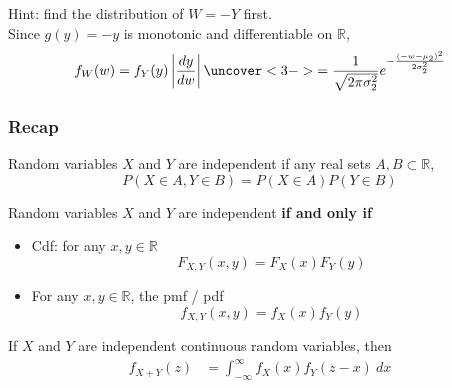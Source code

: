 \documentclass[slidestop,compress,mathserif]{beamer}
\begin{document}
%
%
%


\begin{frame}%
\pause
Hint: find the distribution of $W = -Y$ first. \\
Since $g(y) = -y$ is monotonic and differentiable on $\mathbb{R}$,
\[
f_W(w) = f_Y(y) \left| \frac{dy}{dw} \right| \uncover<3->{= \frac{1}{\sqrt{2\pi \sigma^2_2}} e^{-\frac{(-w - \mu_2)^2}{2\sigma^2_2}} }
\]
\end{frame}


\begin{frame}\frametitle{Recap}

Random variables $X$ and $Y$ are independent if any real sets $A, B \subset \mathbb{R}$,
\[P(X \in A, Y \in B) = P(X \in A) P(Y \in B)\]

Random variables $X$ and $Y$ are independent {\bf if and only if}
\begin{itemize}
\item Cdf: for any $x, y \in \mathbb{R}$
\[F_{X, Y}(x, y) = F_X(x) F_Y(y)\]
\item  For any $x, y \in \mathbb{R}$, the pmf / pdf
\[f_{X, Y}(x, y) = f_X(x) f_Y(y)\]
\end{itemize}

If $X$ and $Y$ are independent continuous random variables, then
\begin{align*}
f_{X+Y}(z) &= \int_{-\infty}^\infty f_X(x)f_Y(z-x)~dx \\
\end{align*}


\end{frame}
\end{document}
